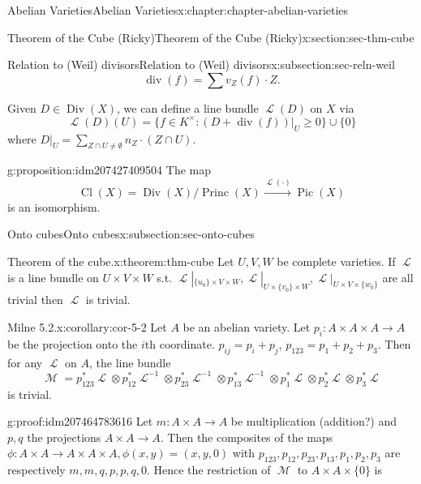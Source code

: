 \documentclass[oneside,10pt,]{book}
\numberwithin{equation}{section}
\newcommand{\sheaf}[1]{\operatorname{\mathcal{#1}}}
\DeclareMathOperator{\divisor}{div}
\DeclareMathOperator{\Div}{Div}
\DeclareMathOperator{\Cl}{Cl}
\DeclareMathOperator{\Pic}{Pic}
\DeclareMathOperator{\Princ}{Princ}
\begin{document}
\begin{chapterptx}{Abelian Varieties}{}{Abelian Varieties}{}{}{x:chapter:chapter-abelian-varieties}
\begin{sectionptx}{Theorem of the Cube (Ricky)}{}{Theorem of the Cube (Ricky)}{}{}{x:section:sec-thm-cube}
\begin{subsectionptx}{Relation to (Weil) divisors}{}{Relation to (Weil) divisors}{}{}{x:subsection:sec-reln-weil}
\begin{equation*}
\divisor (f) = \sum v_Z(f) \cdot Z\text{.}
\end{equation*}
%
\par
Given \(D \in \Div(X)\), we can define a line bundle \(\sheaf L(D)\) on \(X\) via%
\begin{equation*}
\sheaf L(D)(U) = \{f\in K^\times : (D + \divisor (f))|_U\ge 0 \} \cup \{0\}
\end{equation*}
where \(D|_U = \sum_{Z\cap U\ne \emptyset} n_Z\cdot (Z\cap U)\).%
\begin{proposition}{}{}{g:proposition:idm207427409504}%
The map%
\begin{equation*}
\Cl(X) = \Div(X)/\Princ(X) \xrightarrow{\sheaf L(\cdot)} \Pic(X)
\end{equation*}
is an isomorphism.%
\end{proposition}
\end{subsectionptx}
%
%
\typeout{************************************************}
\typeout{************************************************}
%
\begin{subsectionptx}{Onto cubes}{}{Onto cubes}{}{}{x:subsection:sec-onto-cubes}
\begin{theorem}{Theorem of the cube.}{}{x:theorem:thm-cube}%
Let \(U,V,W\) be complete varieties. If \(\sheaf L \) is a line bundle on \(U\times V\times W\) s.t. \(\sheaf L|_{\{u_0\}\times V\times W},\sheaf L|_{U\times \{v_0\}\times W}, \sheaf L|_{U\times V\times \{w_0\}}\) are all trivial then \(\sheaf L\) is trivial.%
\end{theorem}
\begin{corollary}{Milne 5.2.}{}{x:corollary:cor-5-2}%
Let \(A\) be an abelian variety. Let \(p_i\colon A\times A\times A \to A\) be the projection onto the \(i\)th coordinate. \(p_{ij} = p_i+p_j\), \(p_{123} = p_1+p_2+p_3\). Then for any \(\sheaf L\) on \(A\), the line bundle%
\begin{equation*}
\sheaf M  = p_{123}^*\sheaf L \otimes p_{12}^*\sheaf L^{-1}\otimes p_{23}^*\sheaf L^{-1}\otimes p_{13}^*\sheaf L^{-1} \otimes p_1^*\sheaf L \otimes p_2^*\sheaf L \otimes p_3^*\sheaf L
\end{equation*}
is trivial.%
\end{corollary}
\begin{proofptx}{}{g:proof:idm207464783616}
Let  \(m \colon A\times A \to A\) be multiplication (addition?) and \(p,q\) the projections \(A\times A \to A\). Then the composites of the maps \(\phi\colon A\times A \to A \times A \times A, \phi(x,y) = (x,y,0)\) with \(p_{123}, p_{12}, p_{23}, p_{13}, p_1, p_2, p_3\) are respectively \(m,m,q, p, p, q, 0\). Hence the restriction of \(\sheaf M\) to \(A \times A \times \{0\}\) is%

\end{proofptx}
\end{subsectionptx}
\end{sectionptx}
\end{chapterptx}
\end{document}
